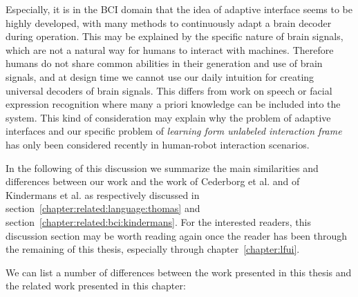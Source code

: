 Especially, it is in the BCI domain that the idea of adaptive interface seems to be highly developed, with many methods to continuously adapt a brain decoder during operation. This may be explained by the specific nature of brain signals, which are not a natural way for humans to interact with machines. Therefore humans do not share common abilities in their generation and use of brain signals, and at design time we cannot use our daily intuition for creating universal decoders of brain signals. This differs from work on speech or facial expression recognition where many a priori knowledge can be included into the system. This kind of consideration may explain why the problem of adaptive interfaces and our specific problem of \emph{learning form unlabeled interaction frame}  has only been considered recently in human-robot interaction scenarios.

In the following of this discussion we summarize the main similarities and differences between our work and the work of Cederborg et al. and of Kindermans et al. as respectively discussed in  section~\ref{chapter:related:language:thomas} and section~\ref{chapter:related:bci:kindermans}. For the interested readers, this discussion section may be worth reading again once the reader has been through the remaining of this thesis, especially through chapter~\ref{chapter:lfui}.

We can list a number of differences between the work presented in this thesis and the related work presented in this chapter:

